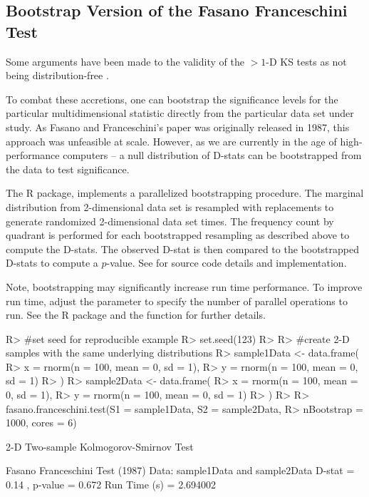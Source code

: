 \documentclass[codesnippet]{jss}
\newcommand{\fct}[1]{\code{#1()}}
\begin{document}
\subsection{Bootstrap Version of the Fasano Franceschini Test}

Some arguments have been made to the validity of the $>1$-D KS tests as not being distribution-free \citep{Babu2006}.

To combat these accretions, one can bootstrap the significance levels for the particular multidimensional statistic directly from the particular data set under study. As Fasano and Franceschini's paper was originally released in 1987, this approach was unfeasible at scale. However, as we are currently in the age of high-performance computers -- a null distribution of D-stats can be bootstrapped from the data to test significance.

The  R package, implements a parallelized bootstrapping procedure. The marginal distribution from 2-dimensional data set is resampled with replacements to generate randomized 2-dimensional data set  times. The frequency count by quadrant is performed for each bootstrapped resampling as described above to compute the D-stats. The observed D-stat is then compared to the bootstrapped D-stats to compute a $p$-value. See \fct{fasano.franceschini.test} for source code details and implementation.

Note, bootstrapping may significantly increase run time performance. To improve run time, adjust the  parameter to specify the number of parallel operations to run. See the R  package and the \fct{mclapply} function for further details.

\begin{CodeChunk}
\begin{CodeInput}
R> #set seed for reproducible example
R> set.seed(123)
R>
R> #create 2-D samples with the same underlying distributions
R> sample1Data <- data.frame(
R>  x = rnorm(n = 100, mean = 0, sd = 1),
R>  y = rnorm(n = 100, mean = 0, sd = 1)
R> )
R> sample2Data <- data.frame(
R>  x = rnorm(n = 100, mean = 0, sd = 1),
R>  y = rnorm(n = 100, mean = 0, sd = 1)
R> )
R>
R> fasano.franceschini.test(S1 = sample1Data, S2 = sample2Data,
R>                          nBootstrap = 1000, cores = 6)
\end{CodeInput}
\begin{CodeOutput}
      2-D Two-sample Kolmogorov-Smirnov Test

 Fasano Franceschini Test (1987)
 Data:  sample1Data and sample2Data
 D-stat =  0.14 , p-value =  0.672
 Run Time (s) =  2.694002
\end{CodeOutput}
\end{CodeChunk}
\end{document}

